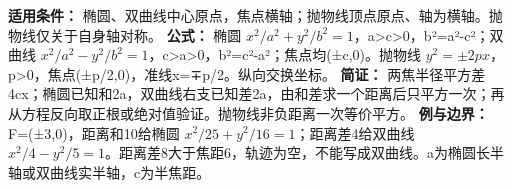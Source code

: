 \textbf{适用条件：} 椭圆、双曲线中心原点，焦点横轴；抛物线顶点原点、轴为横轴。抛物线仅关于自身轴对称。
\textbf{公式：} 椭圆 $x^2/a^2+y^2/b^2=1$，a>c>0，b²=a²-c²；双曲线 $x^2/a^2-y^2/b^2=1$，c>a>0，b²=c²-a²；焦点均(±c,0)。抛物线 $y^2=\pm2px$，p>0，焦点(±p/2,0)，准线x=∓p/2。纵向交换坐标。
\textbf{简证：} 两焦半径平方差4cx；椭圆已知和2a，双曲线右支已知差2a，由和差求一个距离后只平方一次；再从方程反向取正根或绝对值验证。抛物线非负距离一次等价平方。
\textbf{例与边界：} F=(±3,0)，距离和10给椭圆 $x^2/25+y^2/16=1$；距离差4给双曲线 $x^2/4-y^2/5=1$。距离差8大于焦距6，轨迹为空，不能写成双曲线。a为椭圆长半轴或双曲线实半轴，c为半焦距。
